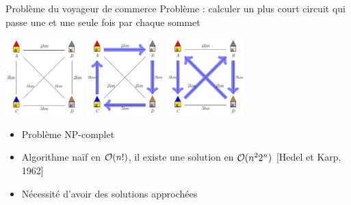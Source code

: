 \begin{frame}{Problème du voyageur de commerce}
    Problème : calculer un plus court circuit qui passe une et une seule fois par chaque sommet
\begin{center}
    \includegraphics[width=3cm]{fig/Tsp_instance.png}
    \includegraphics[width=3cm]{fig/Tsp_solution_debile.png}
    \includegraphics[width=3cm]{fig/Tsp_opt.png}
\end{center}
\begin{itemize}
    \item Problème NP-complet 
    \item Algorithme naïf en ${\cal O}(n!)$, il existe une solution en ${\cal O}(n^2 2^n)$ [Hedel et Karp, 1962]
    \item Nécessité d'avoir des solutions approchées 
\end{itemize}
\end{frame}

